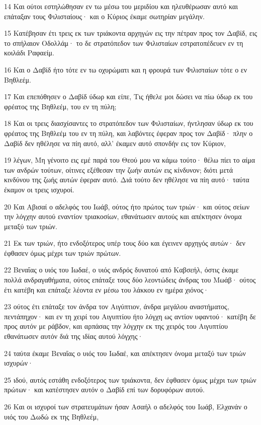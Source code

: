 \par 14 Και ούτοι εστηλώθησαν εν τω μέσω του μεριδίου και ηλευθέρωσαν αυτό και επάταξαν τους Φιλισταίους· και ο Κύριος έκαμε σωτηρίαν μεγάλην.
\par 15 Κατέβησαν έτι τρεις εκ των τριάκοντα αρχηγών εις την πέτραν προς τον Δαβίδ, εις το σπήλαιον Οδολλάμ· το δε στρατόπεδον των Φιλισταίων εστρατοπέδευεν εν τη κοιλάδι Ραφαείμ.
\par 16 Και ο Δαβίδ ήτο τότε εν τω οχυρώματι και η φρουρά των Φιλισταίων τότε ο εν Βηθλεέμ.
\par 17 Και επεπόθησεν ο Δαβίδ ύδωρ και είπε, Τις ήθελε μοι δώσει να πίω ύδωρ εκ του φρέατος της Βηθλεέμ, του εν τη πύλη;
\par 18 Και οι τρεις διασχίσαντες το στρατόπεδον των Φιλισταίων, ήντλησαν ύδωρ εκ του φρέατος της Βηθλεέμ του εν τη πύλη, και λαβόντες έφεραν προς τον Δαβίδ· πλην ο Δαβίδ δεν ηθέλησε να πίη αυτό, αλλ' έκαμεν αυτό σπονδήν εις τον Κύριον,
\par 19 λέγων, Μη γένοιτο εις εμέ παρά του Θεού μου να κάμω τούτο· θέλω πίει το αίμα των ανδρών τούτων, οίτινες εξέθεσαν την ζωήν αυτών εις κίνδυνον; διότι μετά κινδύνου της ζωής αυτών έφεραν αυτό. Διά τούτο δεν ηθέλησε να πίη αυτό· ταύτα έκαμον οι τρεις ισχυροί.
\par 20 Και Αβισαί ο αδελφός του Ιωάβ, ούτος ήτο πρώτος των τριών· και ούτος σείων την λόγχην αυτού εναντίον τριακοσίων, εθανάτωσεν αυτούς και απέκτησεν όνομα μεταξύ των τριών.
\par 21 Εκ των τριών, ήτο ενδοξότερος υπέρ τους δύο και έγεινεν αρχηγός αυτών· δεν έφθασεν όμως μέχρι των τριών πρώτων.
\par 22 Βεναΐας ο υιός του Ιωδαέ, ο υιός ανδρός δυνατού από Καβσεήλ, όστις έκαμε πολλά ανδραγαθήματα, ούτος επάταξε τους δύο λεοντώδεις άνδρας του Μωάβ· ούτος έτι κατέβη και επάταξε λέοντα εν μέσω του λάκκου εν ημέρα χιόνος·
\par 23 ούτος έτι επάταξε τον άνδρα τον Αιγύπτιον, άνδρα μεγάλου αναστήματος, πεντάπηχον· και εν τη χειρί του Αιγυπτίου ήτο λόγχη ως αντίον υφαντού· κατέβη δε προς αυτόν με ράβδον, και αρπάσας την λόγχην εκ της χειρός του Αιγυπτίου εθανάτωσεν αυτόν διά της ιδίας αυτού λόγχης·
\par 24 ταύτα έκαμε Βεναΐας ο υιός του Ιωδαέ, και απέκτησεν όνομα μεταξύ των τριών ισχυρών·
\par 25 ιδού, αυτός εστάθη ενδοξότερος των τριάκοντα, δεν έφθασεν όμως μέχρι των τριών πρώτων· και κατέστησεν αυτόν ο Δαβίδ επί των δορυφόρων αυτού.
\par 26 Και οι ισχυροί των στρατευμάτων ήσαν Ασαήλ ο αδελφός του Ιωάβ, Ελχανάν ο υιός του Δωδώ εκ της Βηθλεέμ,
